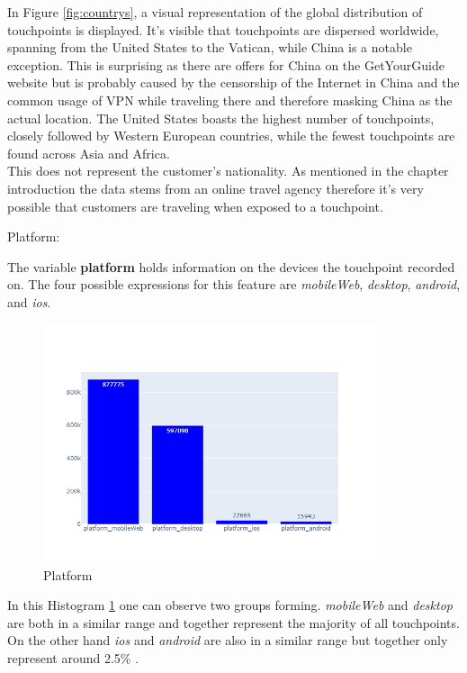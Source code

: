 In Figure \ref{fig:countrys}, a visual representation of the global distribution of touchpoints is displayed. It's visible that touchpoints are dispersed worldwide, spanning from the United States to the Vatican, while China is a notable exception. This is surprising as there are offers for China on the GetYourGuide website but is probably caused by the censorship of the Internet in China and the common usage of VPN while traveling there and therefore masking China as the actual location. 
The United States boasts the highest number of touchpoints, closely followed by Western European countries, while the fewest touchpoints are found across Asia and Africa. \\
This does not represent the customer's nationality. As mentioned in the chapter introduction the data stems from an online travel agency therefore it's very possible that customers are traveling when exposed to a touchpoint.

\begin{description}
    \item[Platform:]
\end{description}
The variable \textbf{platform} holds information on the devices the touchpoint recorded on. The four possible expressions for this feature are \textit{mobileWeb}, \textit{desktop}, \textit{android}, and \textit{ios}.  

\begin{figure}[h]
\centering
\includegraphics[height=7cm]{images/platforms.png}
\caption{Platform}
\label{fig:plattform}
\end{figure}

In this Histogram \ref{fig:plattform} one can observe two groups forming. \textit{mobileWeb} and \textit{desktop} are both in a similar range and together represent the majority of all touchpoints. On the other hand \textit{ios} and \textit{android} are also in a similar range but together only represent around 2.5\% .\\

